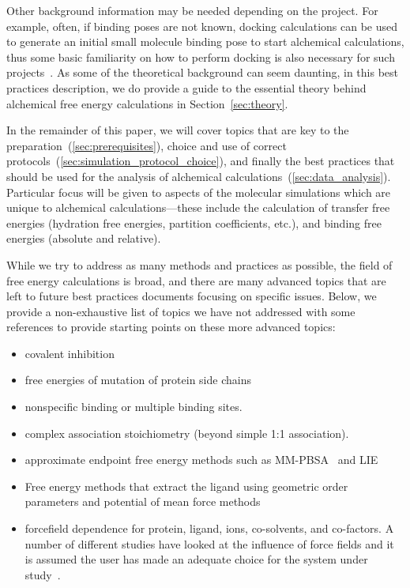 \documentclass[9pt,bestpractices]{livecoms}
\begin{document}
Other background information may be needed depending on the project. For example, often, if binding poses are not known, docking calculations can be used to generate an initial small molecule binding pose to start alchemical calculations, thus some basic familiarity on how to perform docking is also necessary for such projects~\cite{grinter2014challenges}. 
%
As some of the theoretical background can seem daunting, in this best practices description, we do provide a guide to the essential theory behind alchemical free energy calculations in Section~\ref{sec:theory}.

In the remainder of this paper, we will cover topics that are key to the preparation~(\ref{sec:prerequisites}), choice and use of correct protocols~(\ref{sec:simulation_protocol_choice}), and finally the best practices that should be used for the analysis of alchemical calculations~(\ref{sec:data_analysis}). 
Particular focus will be given to aspects of the molecular simulations which are unique to alchemical calculations---these include the calculation of transfer free energies (hydration free energies, partition coefficients, etc.), and binding free energies (absolute and relative).
%

While we try to address as many methods and practices as possible, the field of free energy calculations is broad, and there are many advanced topics that are left to future best practices documents focusing on specific issues. 
Below, we provide a non-exhaustive list of topics we have not addressed with some references to provide starting points on these more advanced topics:
\begin{itemize}
\item covalent inhibition
\item free energies of mutation of protein side chains
\item nonspecific binding or multiple binding sites.
\item complex association stoichiometry (beyond simple 1:1 association).
\item approximate endpoint free energy methods such as MM-PBSA~\cite{genheden2015mm} and LIE~\cite{gutierrez-de-teran2012linear}
\item Free energy methods that extract the ligand using geometric order parameters and potential of mean force methods~\cite{heinzelmann2017attachpullrelease}
\item forcefield dependence for protein, ligand, ions, co-solvents, and co-factors. A number of different studies have looked at the influence of force fields and it is assumed the user has made an adequate choice for the system under study~\cite{loeffler2018reproducibility, vassetti2019assessment, lopes2015current}. 
\end{itemize}
%
\end{document}
